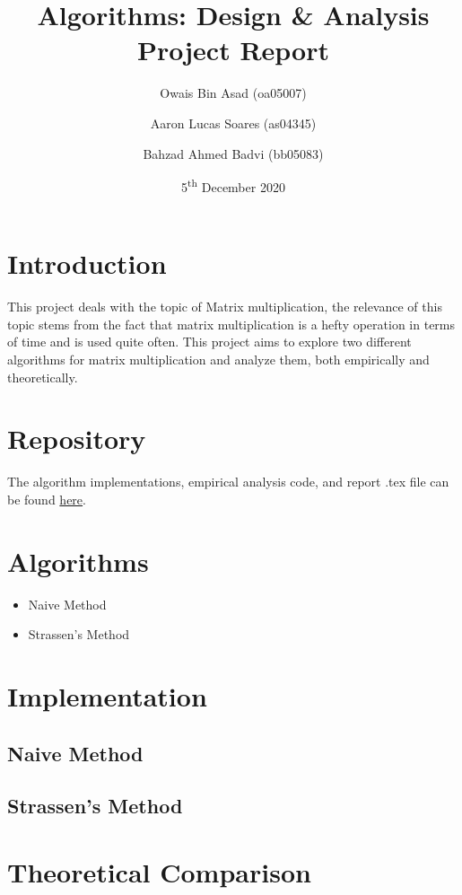 \documentclass{article}
\title{Algorithms: Design \& Analysis\\Project Report}
\author{Owais Bin Asad (oa05007) \and Aaron Lucas Soares (as04345) \and Bahzad Ahmed Badvi (bb05083)}
\date{5\textsuperscript{th} December 2020}
\begin{document}
\maketitle

\section{Introduction}
This project deals with the topic of Matrix multiplication, the relevance of this topic stems from the fact that matrix multiplication is a hefty operation in terms of time and is used quite often. This project aims to explore two different algorithms for matrix multiplication and analyze them, both empirically and theoretically.

\section{Repository}
The algorithm implementations, empirical analysis code, and report .tex file can be found \href{https://github.com/doodhJalebi/CS-412-Final-Project}{here}.

\section{Algorithms}
\begin{itemize}
    \item Naive Method
    \item Strassen's Method
\end{itemize}

\section{Implementation}
\subsection{Naive Method}


\subsection{Strassen's Method}


\section{Theoretical Comparison}
\end{document}
